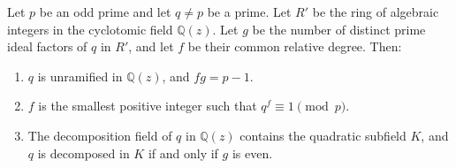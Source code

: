 Let $p$ be an odd prime and let $q \neq p$ be a prime. Let $R'$ be the ring of algebraic integers in the cyclotomic field $\mathbb{Q}(z)$. Let $g$ be the number of distinct prime ideal factors of $q$ in $R'$, and let $f$ be their common relative degree. Then:
\begin{enumerate}
\item $q$ is unramified in $\mathbb{Q}(z)$, and $fg = p - 1$.
\item $f$ is the smallest positive integer such that $q^f \equiv 1 \pmod{p}$.
\item The decomposition field of $q$ in $\mathbb{Q}(z)$ contains the quadratic subfield $K$, and $q$ is decomposed in $K$ if and only if $g$ is even.
\end{enumerate}
